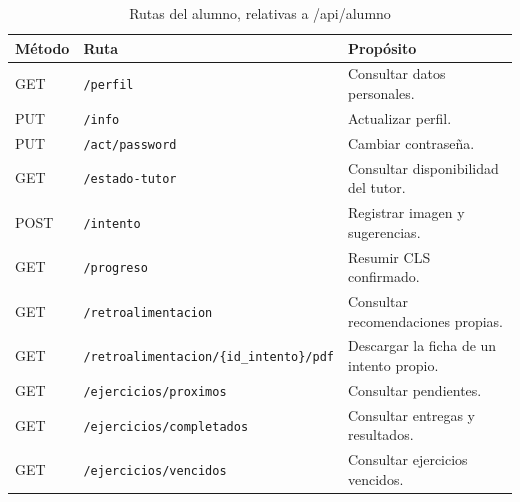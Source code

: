 \begin{longtable}{p{1.7cm}p{7.1cm}p{5.4cm}}
\caption{Rutas del alumno, relativas a /api/alumno}\label{tab:arquitectura_alumnos}\\
\toprule Método & Ruta & Propósito \\ \midrule
GET & \texttt{/perfil} & Consultar datos personales. \\
PUT & \texttt{/info} & Actualizar perfil. \\
PUT & \texttt{/act/password} & Cambiar contraseña. \\
GET & \texttt{/estado-tutor} & Consultar disponibilidad del tutor. \\
POST & \texttt{/intento} & Registrar imagen y sugerencias. \\
GET & \texttt{/progreso} & Resumir CLS confirmado. \\
GET & \texttt{/retroalimentacion} & Consultar recomendaciones propias. \\
GET & \texttt{/retroalimentacion/}\newline\texttt{\{id\_intento\}/pdf} & Descargar la ficha de un intento propio. \\
GET & \texttt{/ejercicios/proximos} & Consultar pendientes. \\
GET & \texttt{/ejercicios/completados} & Consultar entregas y resultados. \\
GET & \texttt{/ejercicios/vencidos} & Consultar ejercicios vencidos. \\
\bottomrule
\end{longtable}

